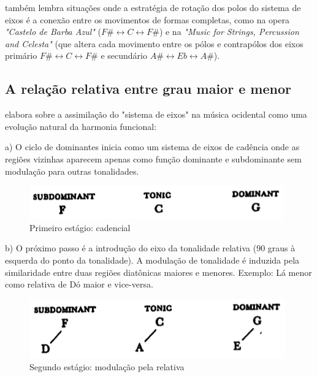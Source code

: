 \documentclass[
	12pt,				%
	openright,			%
	twoside,			%
	a4paper,			%
	english,			%
	french,				%
	spanish,			%
	brazil				%
	]{abntex2}
\begin{document}
 também lembra situações onde a estratégia de rotação dos polos do sistema de eixos é a conexão entre os movimentos de formas completas, como na opera \textit{"Castelo de Barba Azul"} ($F\# \leftrightarrow  C \leftrightarrow F\#$) e na \textit{"Music for Strings, Percussion and Celesta" } (que altera cada movimento entre os pólos e contrapólos dos eixos primário $F\# \leftrightarrow  C \leftrightarrow F\#$ e secundário $A\# \leftrightarrow  Eb \leftrightarrow A\#$).
\pagebreak


\subsection{A relação relativa entre grau maior e menor}

\cite[ p.08]{lendvai1971bela} elabora sobre a assimilação do "sistema de eixos" na música ocidental como uma evolução natural da harmonia funcional: 

a) O ciclo de dominantes inicia como um sistema de eixos de cadência onde as regiões vizinhas aparecem apenas como função dominante e subdominante sem modulação para outras tonalidades. 

\begin{figure}[!h]
	\caption{\label{fig_grafico}Primeiro estágio: cadencial}
	\begin{center}
	    \includegraphics[scale=0.6]{axis/estagio01.png}
	\end{center}
\end{figure}


b) O próximo passo é a introdução do eixo da tonalidade relativa (90 graus à esquerda do ponto da tonalidade). A modulação de tonalidade é induzida pela similaridade entre duas regiões diatônicas maiores e menores. Exemplo: Lá menor como relativa de Dó maior e vice-versa.

\begin{figure}[!h]
	\caption{\label{fig_grafico}Segundo estágio: modulação pela relativa}
	\begin{center}
	    \includegraphics[scale=0.6]{axis/estagio02.png}
	\end{center}
\end{figure}
\end{document}

